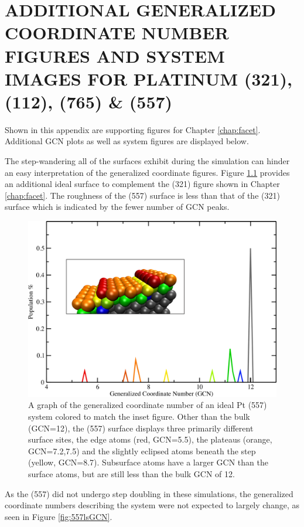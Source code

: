 
\chapter{ADDITIONAL GENERALIZED COORDINATE NUMBER FIGURES AND SYSTEM IMAGES FOR PLATINUM (321), (112), (765) \& (557)}
\label{app:SI2}


Shown in this appendix are supporting figures for Chapter \ref{chap:facet}.
Additional GCN plots as well as system figures are displayed below.
\newpage



The step-wandering all of the surfaces exhibit during the simulation can hinder
an easy interpretation of the generalized coordinate figures. Figure
\ref{fig:557GCN} provides an additional ideal surface to complement the (321)
figure shown in Chapter \ref{chap:facet}. The roughness of the (557) surface is
less than that of the (321) surface which is indicated by the fewer number of GCN
peaks. 

\begin{figure}
\centering
\includegraphics[width=0.9\linewidth]{../figures/appB/557_ideal_gcn.pdf}
\caption{A graph of the generalized coordinate number of an ideal Pt (557)
system colored to match the inset figure. Other than the bulk (GCN=12), the
(557) surface displays three primarily different surface sites, the edge atoms
(red, GCN=5.5), the plateaus (orange, GCN=7.2,7.5) and the slightly eclipsed
atoms beneath the step (yellow, GCN=8.7). Subsurface atoms have a larger GCN
than the surface atoms, but are still less than the bulk GCN of 12.}
\label{fig:557GCN}
\end{figure}
\newpage


As the  (557) did not undergo step doubling in these simulations, the
generalized coordinate numbers describing the system were not expected to
largely change, as seen in Figure \ref{fig:557lsGCN}.

